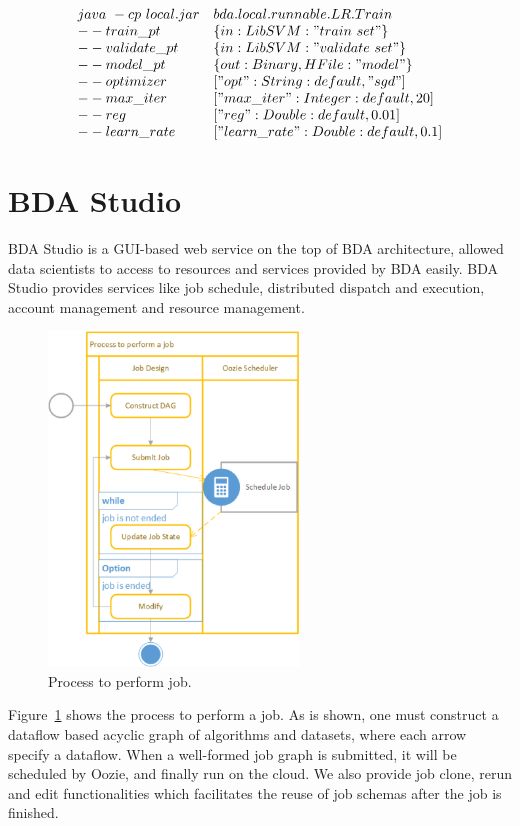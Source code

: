 \documentclass{sig-alternate-05-2015}
\begin{document}
$$
\begin{array}{ll}
java~-cp~local.jar & bda.local.runnable.LR.Train \\
--train\_pt & \{in:LibSVM:"train~set"\}\\
--validate\_pt & \{in:LibSVM:"validate~set"\}\\
--model\_pt & \{out:Binary,HFile:"model"\}\\
--optimizer & ["opt":String:default,"sgd"]\\
--max\_iter & ["max\_iter":Integer:default,20]\\
--reg & ["reg":Double:default,0.01]\\
--learn\_rate & ["learn\_rate":Double:default,0.1]
\end{array}
$$


\section{BDA Studio}
BDA Studio is a GUI-based web service on the top of BDA architecture, allowed data scientists to access to resources and services provided by BDA easily. BDA Studio provides services like job schedule, distributed dispatch and execution, account management and resource management. 

\begin{figure}
\centering
\includegraphics[height=3.5in]{proc.eps}
\caption{ Process to perform job.}
\label{fig:proc}
\end{figure}

Figure~\ref{fig:proc} shows the process to perform a job. As is shown, one must construct a dataflow based acyclic graph of algorithms and datasets, where each arrow specify a dataflow. When a well-formed job graph is submitted, it will be scheduled by Oozie, and finally run on the cloud. We also provide job clone, rerun and edit functionalities which facilitates the reuse of job schemas after the job is finished. 
\end{document}
